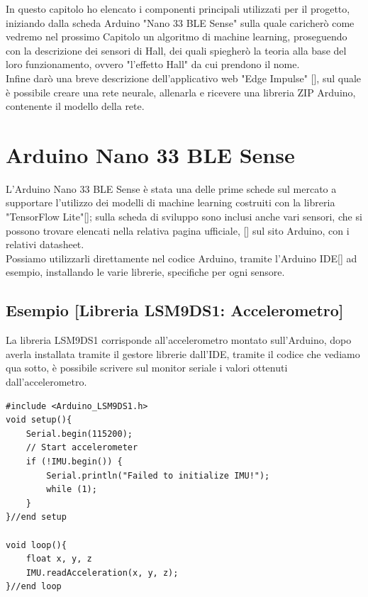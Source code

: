
\label{01-chapter}
In questo capitolo ho elencato i componenti principali utilizzati per il progetto, iniziando dalla scheda Arduino "Nano 33 BLE Sense" sulla quale caricherò come vedremo nel prossimo Capitolo un algoritmo di machine learning, proseguendo con la descrizione dei sensori di Hall, dei quali spiegherò la teoria alla base del loro funzionamento, ovvero "l'effetto Hall" da cui prendono il nome.\\
Infine darò una breve descrizione dell'applicativo web "Edge Impulse" [], sul quale è possibile creare una rete neurale, allenarla e ricevere una libreria ZIP Arduino, contenente il modello della rete.



\section{Arduino Nano 33 BLE Sense} \label{sezione 1-1}
L'Arduino Nano 33 BLE Sense è stata una delle prime schede sul mercato a supportare l'utilizzo dei modelli di machine learning costruiti con la libreria "TensorFlow Lite"[]; sulla scheda di sviluppo sono inclusi anche vari sensori, che si possono trovare elencati nella relativa pagina ufficiale, [] sul sito Arduino, con i relativi datasheet.\\
Possiamo utilizzarli direttamente nel codice Arduino, tramite l'Arduino IDE[] ad esempio, installando le varie librerie, specifiche per ogni sensore.\\


\subsection{Esempio [Libreria LSM9DS1: Accelerometro]}
La libreria LSM9DS1 corrisponde all'accelerometro montato sull'Arduino, dopo averla installata tramite il gestore librerie dall'IDE, tramite il codice che vediamo qua sotto, è possibile scrivere sul monitor seriale i valori ottenuti dall'accelerometro.
\begin{lstlisting}[language=Arduino]
#include <Arduino_LSM9DS1.h>
void setup(){
    Serial.begin(115200);
    // Start accelerometer
    if (!IMU.begin()) {
        Serial.println("Failed to initialize IMU!");
        while (1);
    }
}//end setup

void loop(){
    float x, y, z
    IMU.readAcceleration(x, y, z);
}//end loop
\end{lstlisting}
\noindent\makebox[\linewidth]{\rule{15mm}{.4mm}}



